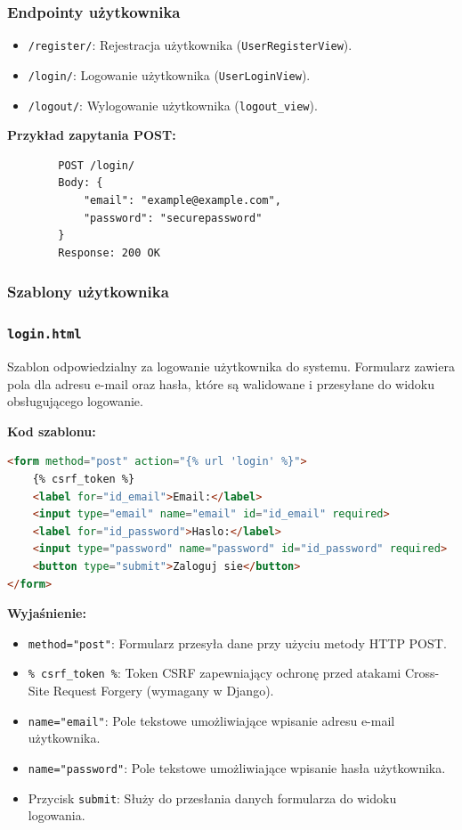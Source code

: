 \documentclass[12pt,a4paper,oneside]{article}
\theoremstyle{definition}
\numberwithin{equation}{section}
\begin{document}
\subsubsection{Endpointy użytkownika}

\begin{itemize}
    \item \texttt{/register/}: Rejestracja użytkownika (\texttt{UserRegisterView}).
    \item \texttt{/login/}: Logowanie użytkownika (\texttt{UserLoginView}).
    \item \texttt{/logout/}: Wylogowanie użytkownika (\texttt{logout\_view}).
\end{itemize}

\textbf{Przykład zapytania POST:}
\begin{verbatim}
        POST /login/
        Body: {
            "email": "example@example.com",
            "password": "securepassword"
        }
        Response: 200 OK
\end{verbatim}
\subsubsection{Szablony użytkownika}

\subsubsection*{\texttt{login.html}}
\label{sec:login_template}

Szablon odpowiedzialny za logowanie użytkownika do systemu. Formularz zawiera pola dla adresu e-mail oraz hasła, które są walidowane i przesyłane do widoku obsługującego logowanie.

\textbf{Kod szablonu:}
\begin{lstlisting}[language=HTML, caption=Szablon \texttt{login.html}]
<form method="post" action="{% url 'login' %}">
    {% csrf_token %}
    <label for="id_email">Email:</label>
    <input type="email" name="email" id="id_email" required>
    <label for="id_password">Haslo:</label>
    <input type="password" name="password" id="id_password" required>
    <button type="submit">Zaloguj sie</button>
</form>
\end{lstlisting}

\textbf{Wyjaśnienie:}
\begin{itemize}
    \item \texttt{method="post"}: Formularz przesyła dane przy użyciu metody HTTP POST.
    \item \texttt{{\% csrf\_token \%}}: Token CSRF zapewniający ochronę przed atakami Cross-Site Request Forgery (wymagany w Django).
    \item \texttt{name="email"}: Pole tekstowe umożliwiające wpisanie adresu e-mail użytkownika.
    \item \texttt{name="password"}: Pole tekstowe umożliwiające wpisanie hasła użytkownika.
    \item Przycisk \texttt{submit}: Służy do przesłania danych formularza do widoku logowania.
\end{itemize}
\end{document}

